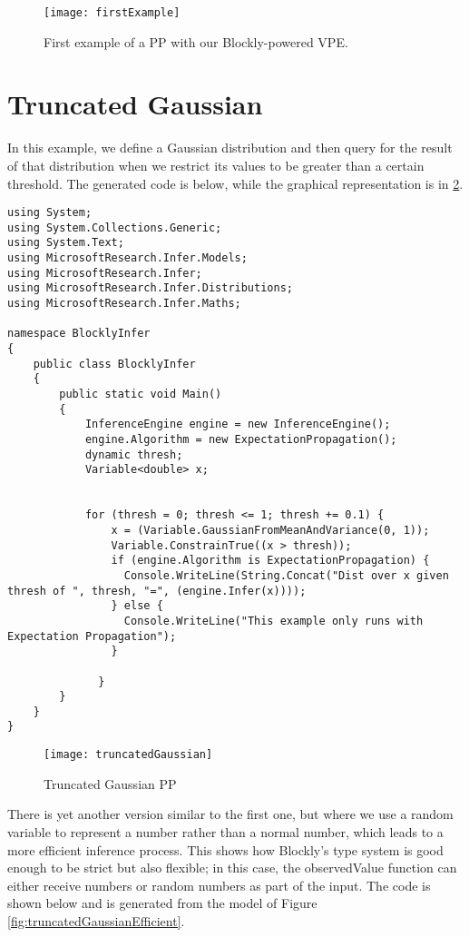 \begin{figure}[!htpb]
  \begin{center}
    \leavevmode
    \texttt{[image: firstExample]}
    \caption{First example of a PP with our Blockly-powered VPE.}
    \label{fig:firstExample}
  \end{center}
\end{figure}

\section{Truncated Gaussian}

In this example, we define a Gaussian distribution and then query for the
result of that distribution when we restrict its values to be greater than a
certain threshold. The generated code is below, while the graphical representation
is in \ref{fig:truncatedGaussian}.

\begin{lstlisting}
using System;
using System.Collections.Generic;
using System.Text;
using MicrosoftResearch.Infer.Models;
using MicrosoftResearch.Infer;
using MicrosoftResearch.Infer.Distributions;
using MicrosoftResearch.Infer.Maths;

namespace BlocklyInfer
{
	public class BlocklyInfer
	{
		public static void Main()
		{
			InferenceEngine engine = new InferenceEngine();
			engine.Algorithm = new ExpectationPropagation();
			dynamic thresh;
			Variable<double> x;


			for (thresh = 0; thresh <= 1; thresh += 0.1) {
			    x = (Variable.GaussianFromMeanAndVariance(0, 1));
			    Variable.ConstrainTrue((x > thresh));
			    if (engine.Algorithm is ExpectationPropagation) {
			      Console.WriteLine(String.Concat("Dist over x given thresh of ", thresh, "=", (engine.Infer(x))));
			    } else {
			      Console.WriteLine("This example only runs with Expectation Propagation");
			    }

			  }
		}
	}
}
\end{lstlisting}

\begin{figure}[!htpb]
  \begin{center}
    \leavevmode
    \texttt{[image: truncatedGaussian]}
    \caption{Truncated Gaussian PP}
    \label{fig:truncatedGaussian}
  \end{center}
\end{figure}

There is yet another version similar to the first one, but where we use a random
variable to represent a number rather than a normal number, which leads to a more
efficient inference process. This shows how Blockly's type system is good
enough to be strict but also flexible; in this case, the observedValue function
can either receive numbers or random numbers as part of the input. The code is shown
below and is generated from the model of Figure \ref{fig:truncatedGaussianEfficient}.

